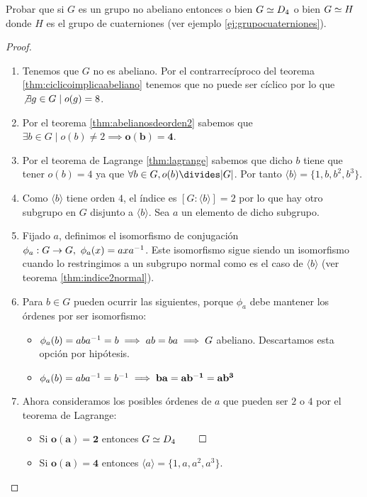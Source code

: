 \begin{ej}
	\label{ej:orden8noabisom}
	Probar que si $G$ es un grupo no abeliano entonces o bien $G \simeq D_4$ o bien $G \simeq H$ donde $H$ es el grupo de cuaterniones (ver ejemplo \ref{ej:grupocuaterniones}).
\end{ej}

\begin{proof}$ $\newline
	\begin{enumerate}
		\item Tenemos que $G$ no es abeliano. Por el contrarrecíproco del teorema \ref{thm:ciclicoimplicaabeliano} tenemos que no puede ser cíclico por lo que $\not\exists g \in G \mid o(g) = 8$.
		\item Por el teorema \ref{thm:abelianosdeorden2} sabemos que $\exists b \in G \mid o(b) \neq 2 \implies \mathbf{o(b) = 4}$.
		\item Por el teorema de Lagrange \ref{thm:lagrange} sabemos que dicho $b$ tiene que tener $o(b) = 4$ ya que $\forall b \in G, o(b) \divides |G|$. Por tanto $\langle b \rangle = \{1, b, b^2, b^3\}$.
		\item Como $\langle b \rangle$ tiene orden $4$, el índice es $[G: \langle b \rangle] = 2$ por lo que hay otro subgrupo en $G$ disjunto a $\langle b \rangle$. Sea $a$ un elemento de dicho subgrupo.
		\item Fijado $a$, definimos el isomorfismo de conjugación $\phi_a: G \to G,\ \phi_a(x) = axa^{-1}$. Este isomorfismo sigue siendo un isomorfismo cuando lo restringimos a un subgrupo normal como es el caso de $\langle b \rangle$ (ver teorema \ref{thm:indice2normal}).
		\item Para $b \in G$ pueden ocurrir las siguientes, porque $\phi_a$ debe mantener los órdenes por ser isomorfismo:
		\begin{itemize}
			\item $\phi_a(b) = aba^{-1} = b \implies ab = ba \implies G$ abeliano. Descartamos esta opción por hipótesis.
			\item $\phi_a(b) = aba^{-1} = b^{-1} \implies \mathbf{ba = ab^{-1} = ab^3}$
		\end{itemize}
		\item Ahora consideramos los posibles órdenes de $a$ que pueden ser $2$ o $4$ por el teorema de Lagrange:
		\begin{itemize}
			\item Si $\mathbf{o(a) = 2}$ entonces $G \simeq D_4\ \qed$
			\item Si $\mathbf{o(a) = 4}$ entonces $\langle a \rangle = \{1, a, a^2, a^3\}$.

\end{itemize}
\end{enumerate}
\end{proof}
